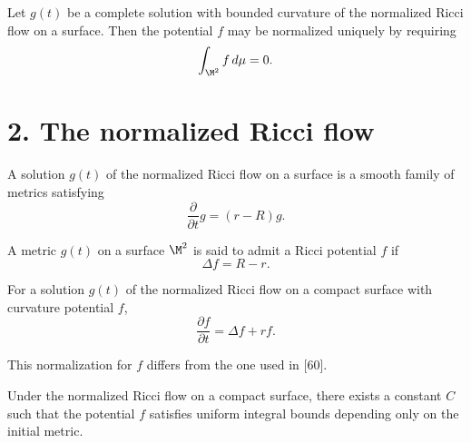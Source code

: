 \begin{lemma}
\label{ch05-lem-potential-normalization}
Let \(g(t)\) be a complete solution with bounded curvature of the normalized Ricci flow on a surface. Then the potential \(f\) may be normalized uniquely by requiring
\[
\int_{\M^2} f\,d\mu = 0.
\]
\end{lemma}

\section*{2. The normalized Ricci flow}

\begin{definition}
\label{ch05-def-normalized-flow}
A solution \(g(t)\) of the normalized Ricci flow on a surface is a smooth family of metrics satisfying
\[
\frac{\partial}{\partial t}g=(r-R)g.
\]
\end{definition}

\begin{definition}
\label{ch05-def-ricci-potential}
A metric \(g(t)\) on a surface \(\M^2\) is said to admit a Ricci potential \(f\) if
\[
\Delta f=R-r.
\]
\end{definition}

\begin{lemma}
\label{ch05-lem-potential-equation}
For a solution \(g(t)\) of the normalized Ricci flow on a compact surface with curvature potential \(f\),
\[
\frac{\partial f}{\partial t}=\Delta f + r f.
\]
\end{lemma}

\begin{remark}
\label{ch05-rem-potential-normalization}
This normalization for \(f\) differs from the one used in [60].
\end{remark}

\begin{corollary}
\label{ch05-cor-potential-time-evolution}
Under the normalized Ricci flow on a compact surface, there exists a constant \(C\) such that the potential \(f\) satisfies uniform integral bounds depending only on the initial metric.
\end{corollary}

